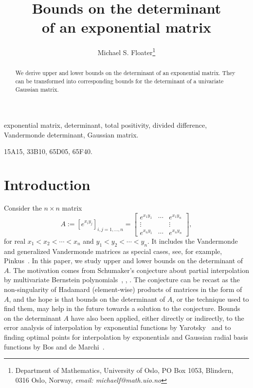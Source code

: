 \documentclass[12pt]{article}
\begin{document}
\title{Bounds on the determinant \\ of an exponential matrix}
\author{
Michael S. Floater\footnote{
Department of Mathematics,
University of Oslo,
PO Box 1053, Blindern,
0316 Oslo,
Norway,
{\it email: michaelf@math.uio.no}}
}                                                                               
                                                                                
\maketitle

\begin{abstract}
We derive upper and lower bounds on the determinant of an exponential matrix.
They can be transformed into corresponding bounds
for the determinant of a univariate Gaussian matrix.
\end{abstract}

 exponential matrix, determinant,
total positivity, divided difference, Vandermonde determinant,
Gaussian matrix.

\smallskip

15A15, %
33B10, %
65D05, %
65F40. %

\section{Introduction}
Consider the $n \times n$ matrix
\begin{equation}\label{eq:A}
A := [e^{x_iy_j}]_{i,j=1,\ldots,n} =
\left[
  \begin{matrix}
  e^{x_1 y_1} & \cdots & e^{x_1 y_n} \\
 \vdots & & \vdots \\
  e^{x_n y_1} & \cdots & e^{x_n y_n}
  \end{matrix}
  \right],
\end{equation}
for real $x_1 < x_2 < \cdots < x_n$ and $y_1 < y_2 < \cdots < y_n$.
It includes the Vandermonde and generalized Vandermonde matrices
as special cases, see, for example,
Pinkus~\cite[Section 4.2]{Pinkus:2009}.
In this paper, we study upper and lower bounds on the
determinant of $A$. The motivation comes
from Schumaker's conjecture
about partial interpolation by multivariate
Bernstein polynomials~\cite{Alfeld:2005}, \cite{Jaklic:2014},
\cite{Floater:2023}. The conjecture can be recast as the
non-singularity of Hadamard (element-wise) products of matrices in the
form of $A$, and the hope is that bounds on the determinant of $A$,
or the technique used to find them,
may help in the future towards a solution to the conjecture.
Bounds on the determinant $A$ have also been applied, either directly
or indirectly, to the error analysis of interpolation by exponential
functions by Yarotsky~\cite{Yarotsky:2013} and to finding optimal points
for interpolation by exponentials and
Gaussian radial basis functions by Bos and de Marchi~\cite{BosdeMarchi:2011}.
\end{document}
